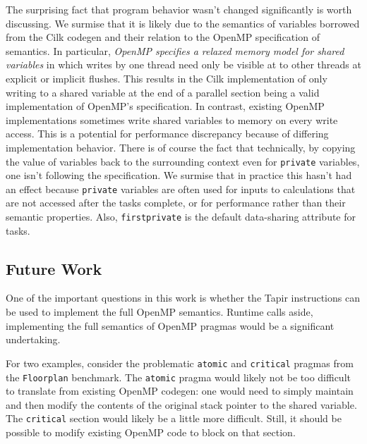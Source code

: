 \documentclass[sigconf]{acmart}
\begin{document}
The surprising fact that program behavior wasn't changed significantly is worth
discussing. We surmise that it is likely due to the semantics of variables
borrowed from the Cilk codegen and their relation to the OpenMP specification
of semantics. In particular, \emph{OpenMP specifies a relaxed memory model
for shared variables} in which writes by one thread need only be visible at
to other threads at explicit or implicit flushes. 
This results in the Cilk implementation of only writing
to a shared variable at the end of a parallel section being a valid
implementation of OpenMP's specification. In contrast, existing OpenMP
implementations sometimes write shared variables to memory on every write
access. This is a potential for performance discrepancy because of differing
implementation behavior.
There is of course the fact that technically, by copying the value of variables
back to the surrounding context even for \texttt{private} variables, one isn't
following the specification. We surmise that in practice this hasn't had an
effect because \texttt{private} variables are often used for inputs to
calculations that are not accessed after the tasks complete, or for performance
rather than their semantic properties.  Also, \texttt{firstprivate} is the
default data-sharing attribute for tasks.

\subsection{Future Work} \label{Sec:Future}

One of the important questions in this work is whether the Tapir instructions
can be used to implement the full OpenMP semantics.
Runtime calls aside, implementing the full semantics of OpenMP pragmas would be
a significant undertaking.

For two examples, consider the problematic \texttt{atomic} and
\texttt{critical} pragmas from the \texttt{Floorplan} benchmark. The
\texttt{atomic} pragma would likely not be too difficult to translate from
existing OpenMP codegen: one would need to simply maintain and then modify the
contents of the original stack pointer to the shared variable. The
\texttt{critical} section would likely be a little more difficult. Still, it
should be possible to modify existing OpenMP code to block on that section.
\end{document}
